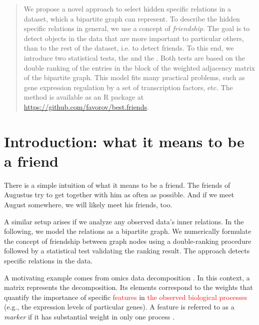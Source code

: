 \documentclass{llncs}
\begin{document}
\begin{abstract}
We propose a novel approach to select hidden specific relations in a dataset, which a bipartite graph can represent. 
To describe the hidden specific relations in general, we use a concept of \textit{friendship}. The goal is to detect objects in the data that are more important to particular others, than to the rest of the dataset, i.e. to detect friends. To this end, we introduce two statistical tests, the  and the . Both tests are based on the double ranking of the entries in the block of the weighted adjacency matrix of the bipartite graph. This model fits many practical problems, such as gene expression regulation by a set of transcription factors, etc. The method is available as an \textsf{R} package at \url{https://github.com/favorov/best.friends}.
\end{abstract}



\section{Introduction: what it means to be a friend}

There is a simple intuition of what it means to be a friend. 
The friends of Augustus try to get together with him as often as possible. And if we meet August somewhere, we will likely meet his friends, too.

A similar setup arises if we analyze any observed data's inner relations. 
In the following, we model the relations as a bipartite graph. We numerically formulate the concept of friendship between graph nodes using a double-ranking procedure followed by a statistical test validating the ranking result. The approach detects specific relations in the data.


A motivating example comes from omics data decomposition \cite{fertig_cogaps_2010, stein-obrien_enter_2018}. In this context, a matrix represents the decomposition. Its elements correspond to the weights that quantify the importance of specific \textcolor{red}{features} in \textcolor{red}{the observed biological processes} (e.g., the expression levels of particular genes). A feature is referred to as a \textit{marker} if it has substantial weight in only one process \cite{stein-obrien_patternmarkers_2017}.
\end{document}

